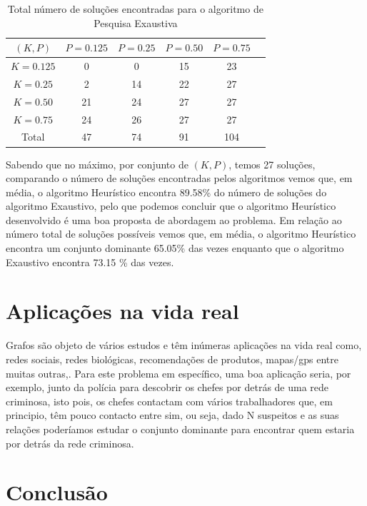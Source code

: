 \documentclass{revdetua}
\begin{document}
\begin{table}[h!]
\caption{Total número de soluções encontradas para o algoritmo de Pesquisa Exaustiva}
\label{ExS}
\small
\centering
\begin{tabular}{|c|c|c|c|c|c|}
\hline
 $(K,P)$  & $P = 0.125$  & $P = 0.25$  & $P = 0.50$ & $P = 0.75$  \\ \hline
$K = 0.125$  & 0 & 0 & 15 & 23 \\ \hline
$K = 0.25$  & 2 & 14 & 22 & 27 \\ \hline
$K = 0.50$ & 21 & 24 &  27 & 27\\ \hline
$K = 0.75$  & 24 &  26 & 27 & 27\\ \hline
Total & 47 &  74 &  91 & 104 \\ \hline
\end{tabular}
\end{table}

Sabendo que no máximo, por conjunto de $(K,P)$, temos 27 soluções, comparando o número de soluções encontradas pelos algoritmos vemos que, em média, o algoritmo Heurístico encontra 89.58\% do número de soluções do algoritmo Exaustivo, pelo que podemos concluir que o algoritmo Heurístico desenvolvido é uma boa proposta de abordagem ao problema. Em relação ao número total de soluções possíveis vemos que, em média, o algoritmo Heurístico encontra um conjunto dominante 65.05\% das vezes enquanto que o algoritmo Exaustivo encontra 73.15 \% das vezes.

\section{Aplicações na vida real}

Grafos são objeto de vários estudos e têm inúmeras aplicações na vida real como, redes sociais, redes biológicas, recomendações de produtos, mapas/gps entre muitas outras,\cite{AppGraphs}. Para este problema em específico, uma boa aplicação seria, por exemplo, junto da polícia para descobrir os chefes por detrás de uma rede criminosa, isto pois, os chefes contactam com vários trabalhadores que, em principio, têm pouco contacto entre sim, ou seja, dado N suspeitos e as suas relações poderíamos estudar o conjunto dominante para encontrar quem estaria por detrás da rede criminosa. %

\section{Conclusão}
\end{document}
